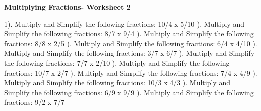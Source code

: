 \documentclass{article}%
\begin{document}
\newline%
\pagebreak%
\large%
\begin{center}%
\textbf{Multiplying Fractions- Worksheet 2}%
\newline%
\newline%
\newline%
\end{center} \normalsize%
1). Multiply and Simplify the following fractions: 10/4 x 5/10%
\newline%
\newline%
). Multiply and Simplify the following fractions: 8/7 x 9/4%
\newline%
\newline%
). Multiply and Simplify the following fractions: 8/8 x 2/5%
\newline%
\newline%
). Multiply and Simplify the following fractions: 6/4 x 4/10%
\newline%
\newline%
). Multiply and Simplify the following fractions: 3/7 x 6/7%
\newline%
\newline%
). Multiply and Simplify the following fractions: 7/7 x 2/10%
\newline%
\newline%
). Multiply and Simplify the following fractions: 10/7 x 2/7%
\newline%
\newline%
). Multiply and Simplify the following fractions: 7/4 x 4/9%
\newline%
\newline%
). Multiply and Simplify the following fractions: 10/3 x 4/3%
\newline%
\newline%
). Multiply and Simplify the following fractions: 6/9 x 9/9%
\newline%
\newline%
). Multiply and Simplify the following fractions: 9/2 x 7/7%
\newline%
\end{document}
